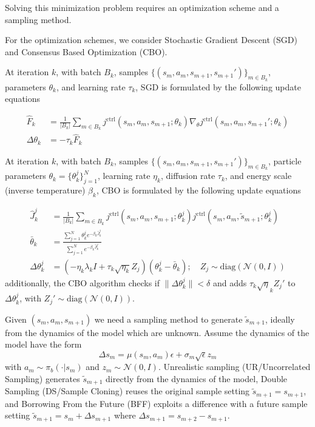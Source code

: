 \documentclass[10.5pt]{article}
\newcommand\cc{\mathcal}
\begin{document}
Solving this minimization problem requires an optimization scheme and a sampling method.

For the optimization schemes, we consider Stochastic Gradient Descent (SGD) and Consensus Based Optimization (CBO).

At iteration $k$, with batch $B_k$, samples $\{(s_m, a_m, s_{m+1},s_{m+1}')\}_{m\in B_k}$, parameters $\theta_k$, and learning rate $\tau_k$, SGD is formulated by the following update equations

\begin{align*}
  \hat F_k &= \frac{1}{|B_k|}\sum_{m\in B_k} j^{\text{ctrl}}(s_m, a_m, s_{m+1};\theta_k )\nabla_\theta j^{\text{ctrl}}(s_m, a_m, s_{m+1}';\theta_k)\\
  \Delta\theta_k &= -\tau_k \hat F_k
\end{align*}

At iteration $k$, with batch $B_k$, samples $\{(s_m, a_m, s_{m+1},s_{m+1}')\}_{m\in B_k}$, particle parameters $\theta_k = \{\theta_k^j\}_{j=1}^N$, learning rate $\eta_k$, diffusion rate $\tau_k$, and energy scale (inverse temperature) $\beta_k$, CBO is formulated by the following update equations

\begin{align*}
  \hat J_k^j &= \frac{1}{|B_k|}\sum_{m\in B_k} j^{\text{ctrl}}(s_m, a_m, s_{m+1};\theta_{k}^j) j^{\text{ctrl}}(s_m, a_m, \tilde s_{m+1};\theta_{k}^j)\\
  \bar\theta_k &= \frac{\sum_{j=1}^N \theta^{j}_{k} e^{-\beta_k \hat J^j_k}}{\sum_{j=1}^N  e^{-\beta_k\hat J_k^j}}\\
  \Delta \theta^{j}_k &= (-\eta_k \lambda_k I+\tau_k\sqrt{\eta_k} Z_j)(\theta^j_{k}-\bar\theta_k); \quad Z_j\sim \text{diag}(\mathcal N(0,I))
\end{align*}
additionally, the CBO algorithm checks if $\|\Delta \theta^j_k\|<\delta$ and adds $\tau_k \sqrt \eta_k Z_j'$ to $\Delta \theta_k^j$, with $Z_j'\sim\text{diag}(\mathcal N(0,I))$.

Given $(s_m,a_m,s_{m+1})$ we need a sampling method to generate $\tilde s_{m+1}$, ideally from the dynamics of the model which are unknown. Assume the dynamics of the model have the form
$$\Delta s_m = \mu(s_m, a_m) \epsilon + \sigma_m \sqrt \epsilon z_m$$ with $a_m\sim \pi_b(\cdot|s_m)$ and $z_m\sim \cc N(0,I)$. Unrealistic sampling (UR/Uncorrelated Sampling) generates $\tilde s_{m+1}$ directly from the dynamics of the model, Double Sampling (DS/Sample Cloning) reuses the original sample setting $\tilde s_{m+1}=s_{m+1}$, and Borrowing From the Future (BFF) exploits a difference with a future sample setting $\tilde s_{m+1}=s_m+\Delta s_{m+1}$ where $\Delta s_{m+1}=s_{m+2}-s_{m+1}$.
\end{document}
